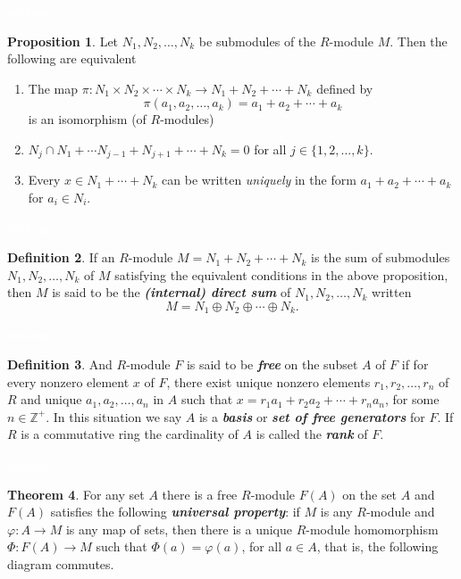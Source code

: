 \documentclass{article}
\theoremstyle{definition}
\newtheorem{thm}{Theorem}[section]
\newtheorem{prop}[thm]{Proposition}
\newtheorem{defn}[thm]{Definition}
\newcommand{\nl}{\textcolor{white}{nothing}}
\newcommand{\ra}{\rightarrow}
\newcommand{\Z}{\mathbb{Z}}
\newcommand{\vphi}{\varphi}
\begin{document}
\nl

\begin{prop}
Let $N_1,N_2,\ldots,N_k$ be submodules of the $R$-module $M$. Then the following are equivalent
\begin{enumerate}
\item The map $\pi:N_1\times N_2\times \cdots \times N_k\ra N_1 + N_2 + \cdots + N_k$ defined by 
\[\pi(a_1,a_2,\ldots,a_k) = a_1 + a_2+\cdots + a_k\]
is an isomorphism (of $R$-modules)
\item $N_j\cap N_1+\cdots N_{j-1} + N_{j + 1} +\cdots +N_k = 0$ for all $j\in \{1,2,\ldots, k\}$.
\item Every $x\in N_1+\cdots + N_k$ can be written \textit{uniquely} in the form $a_1 + a_2 + \cdots + a_k$ for $a_i \in N_i$.
\end{enumerate}
\end{prop}

\nl

\begin{defn}
If an $R$-module $M = N_1 + N_2 + \cdots + N_k$ is the sum of submodules $N_1,N_2,\ldots,N_k$ of $M$ satisfying the equivalent conditions in the above proposition, then $M$ is said to be the \textit{\textbf{(internal) direct sum}} of $N_1, N_2, \ldots, N_k$ written
\[M = N_1 \oplus N_2 \oplus \cdots \oplus N_k.\]
\end{defn}

\nl

\begin{defn}
And $R$-module $F$ is said to be \textbf{\textit{free}} on the subset $A$ of $F$ if for every nonzero element $x$ of $F$, there exist unique nonzero elements $r_1,r_2,\ldots, r_n$ of $R$ and unique $a_1,a_2,\ldots, a_n$ in $A$ such that $x = r_1a_1 + r_2 a_2 + \cdots + r_n a_n$, for some $n\in \Z^+$. In this situation we say $A$ is a \textbf{\textit{basis}} or \textbf{\textit{set of free generators}} for $F$. If $R$ is a commutative ring the cardinality of $A$ is called the \textbf{\textit{rank}} of $F$.
\end{defn}

\nl

\begin{thm}
For any set $A$ there is a free $R$-module $F(A)$ on the set $A$ and $F(A)$ satisfies the following \textbf{\textit{universal property}}: if $M$ is any $R$-module and $\vphi: A\ra M$ is any map of sets, then there is a unique $R$-module homomorphism $\Phi:F(A) \ra M$ such that $\Phi(a) = \vphi(a)$, for all $a\in A$, that is, the following diagram commutes.

\begin{center}
\end{center}

\end{thm}
\end{document}
